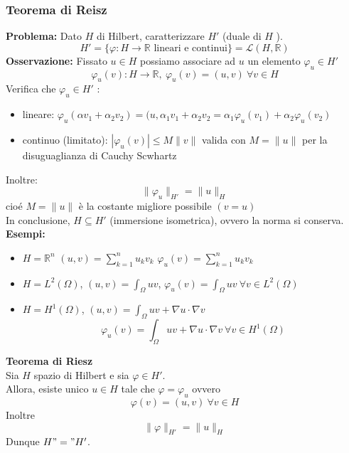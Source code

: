 \documentclass[a4paper]{article}
\newcommand{\R}{\mathbb{R}}
\begin{document}
\subsubsection{Teorema di Reisz}
\textbf{Problema:} Dato $H$ di Hilbert, caratterizzare $H'$ (duale di $H$ ).
\[H'=\{\varphi:H\to \R\text{ lineari e continui}\} =\mathcal L(H,\R)\]
\textbf{Osservazione:} Fissato $u\in H$ possiamo associare ad $u$ un elemento $\varphi_u\in H'$ 
\[\varphi_u(v):H\to \R,\ \varphi_u(v)=(u,v)\ \forall v\in H\]
Verifica che $\varphi_u\in H'$ :
\begin{itemize}
	\item lineare: $\varphi_u(\alpha v_1+\alpha_2v_2)=(u,\alpha_1v_1+\alpha_2v_2=\alpha_1\varphi_u(v_1)+\alpha_2\varphi_u(v_2)$
	\item continuo (limitato): $|\varphi_u(v)|\le M \|v\|$ valida con $M=\|u\|$ per la disuguaglianza di Cauchy Scwhartz

\end{itemize}
Inoltre:
\[\|\varphi_u\|_{H'}=\|u\|_H\]
cioé $M=\|u\|$ è la costante migliore possibile $(v=u)$
\\In conclusione, $H\subseteq  H'$ (immersione isometrica), ovvero la norma si conserva.
\\\textbf{Esempi:} 
\begin{itemize}
	\item $H=\R^n$  $(u,v)=\sum_{k=1}^{n} u_kv_k$  $\varphi_u(v)=\sum_{k=1}^{n} u_kv_k$ 
	\item $H=L^{2}(\Omega)$,  $(u,v)=\int_{\Omega}^{} uv $, $\varphi_u(v)=\int_{\Omega}^{} uv \ \forall v\in L^{2}(\Omega)$
	\item $H=H^1(\Omega)$, $(u,v)=\int_{\Omega}^{} uv+\nabla u\cdot \nabla v $
		\[\varphi_u(v)=\int_{\Omega}^{} uv+\nabla u\cdot \nabla v \ \forall v\in H^1(\Omega)\] 
\end{itemize} 

\begin{tcolorbox}
\textbf{Teorema di Riesz }
\\Sia $H$ spazio di Hilbert e sia $\varphi\in H'$.
\\Allora, esiste unico  $u\in H$ tale che $\varphi=\varphi_u$ ovvero
\[\varphi(v)=(u,v)\ \forall v\in H\]
Inoltre
\[\|\varphi\|_{H'}=\|u\|_H\]
Dunque $H"="H'$.
\end{tcolorbox}
\end{document}
